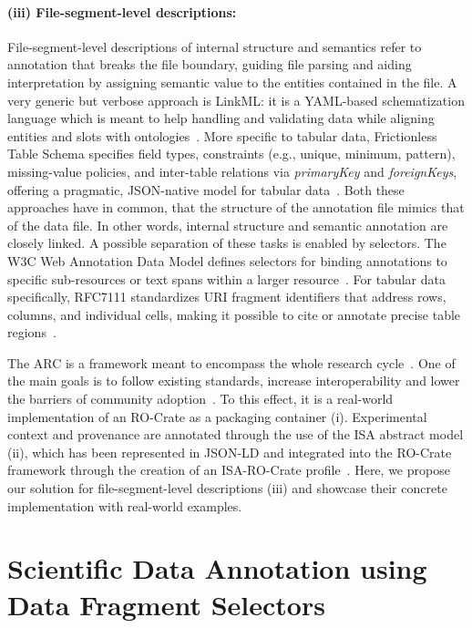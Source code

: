 \documentclass{jib}
\begin{document}
\paragraph{(iii) File-segment-level descriptions:}
File-segment-level descriptions of internal structure and semantics refer to annotation that breaks the file boundary, guiding file parsing and aiding interpretation by assigning semantic value to the entities contained in the file. A very generic but verbose approach is LinkML: it is a YAML-based schematization language which is meant to help handling and validating data while aligning entities and slots with ontologies~\cite{moxon2021linkml}. More specific to tabular data, Frictionless Table Schema specifies field types, constraints (e.g., unique, minimum, pattern), missing-value policies, and inter-table relations via \emph{primaryKey} and \emph{foreignKeys}, offering a pragmatic, JSON-native model for tabular data~\cite{fowler2017frictionless}. Both these approaches have in common, that the structure of the annotation file mimics that of the data file. In other words, internal structure and semantic annotation are closely linked. A possible separation of these tasks is enabled by selectors. The W3C Web Annotation Data Model defines selectors for binding annotations to specific sub-resources or text spans within a larger resource~\cite{sanderson2017annotation}. For tabular data specifically, RFC7111 standardizes URI fragment identifiers that address rows, columns, and individual cells, making it possible to cite or annotate precise table regions~\cite{rfc7111}.

The ARC is a framework meant to encompass the whole research cycle~\cite{weil2023plantdatahub}. One of the main goals is to follow existing standards, increase interoperability and lower the barriers of community adoption~\cite{hughes2023fairdata}. To this effect, it is a real-world implementation of an RO-Crate as a packaging container (i). Experimental context and provenance are annotated through the use of the ISA abstract model (ii), which has been represented in JSON-LD and integrated into the RO-Crate framework through the creation of an ISA-RO-Crate profile~\cite{wetzels2025isaro}. Here, we propose our solution for file-segment-level descriptions (iii) and showcase their concrete implementation with real-world examples.

%
%
\section{Scientific Data Annotation using Data Fragment Selectors}
\end{document}

